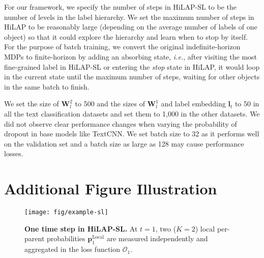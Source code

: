 \documentclass[11pt,a4paper]{article}
\newcommand{\ie}{\textit{i.e.}} \newcommand{\eg}{\textit{e.g.}}
\begin{document}
For our framework, we specify the number of steps in HiLAP-SL to be the number of levels in the label hierarchy.
We set the maximum number of steps in HiLAP to be reasonably large (depending on the average number of labels of one object) so that it could explore the hierarchy and learn when to stop by itself.
For the purpose of batch training, we convert the original indefinite-horizon MDPs to finite-horizon by adding an absorbing state, \ie, after visiting the most fine-grained label in HiLAP-SL or entering the \textit{stop} state in HiLAP, it would loop in the current state until the maximum number of steps, waiting for other objects in the same batch to finish.

We set the size of $\textbf{W}^2_l$ to 500 and the sizes of $\textbf{W}^1_l$ and label embedding $\textbf{l}_t$ to 50 in all the text classification datasets and set them to 1,000 in the other datasets.
We did not observe clear performance changes when varying the probability of dropout in base models like TextCNN.
We set batch size to 32 as it performs well on the validation set and a batch size as large as 128 may cause performance losses.


\section{Additional Figure Illustration}

\begin{figure*}[th]
    \centering
    \texttt{[image: fig/example-sl]}
    \vspace{-.3cm}
     \caption{\textbf{One time step in HiLAP-SL.} At $t=1$, two ($K=2$) local per-parent probabilities $\textbf{p}_1^{\text{Local}}$ are measured independently and aggregated in the loss function $\mathcal{O}_{1}$.}
    \label{fig:example-sl}
    \vspace{-.3cm}
\end{figure*}

 
\end{document}
